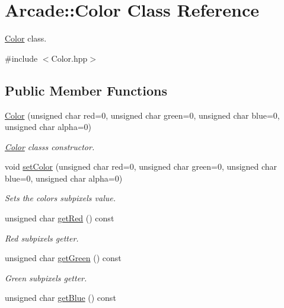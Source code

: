 \hypertarget{class_arcade_1_1_color}{}\section{Arcade\+:\+:Color Class Reference}
\label{class_arcade_1_1_color}


\hyperlink{class_arcade_1_1_color}{Color} class.  




{\ttfamily \#include $<$Color.\+hpp$>$}

\subsection*{Public Member Functions}
\begin{DoxyCompactItemize}
\item 
\hyperlink{class_arcade_1_1_color_a5768ff8d3964d283212a557229c92291}{Color} (unsigned char red=0, unsigned char green=0, unsigned char blue=0, unsigned char alpha=0)
\begin{DoxyCompactList}\small\item\em \hyperlink{class_arcade_1_1_color}{Color} class\textquotesingle{}s constructor. \end{DoxyCompactList}\item 
void \hyperlink{class_arcade_1_1_color_a36b3aa4c6bb04119432f0c7a7721f9dd}{set\+Color} (unsigned char red=0, unsigned char green=0, unsigned char blue=0, unsigned char alpha=0)
\begin{DoxyCompactList}\small\item\em Sets the color\textquotesingle{}s subpixels value. \end{DoxyCompactList}\item 
unsigned char \hyperlink{class_arcade_1_1_color_a536bf6ccc3a5024d5759eb267506742f}{get\+Red} () const
\begin{DoxyCompactList}\small\item\em Red subpixel\textquotesingle{}s getter. \end{DoxyCompactList}\item 
unsigned char \hyperlink{class_arcade_1_1_color_a1cb9e94a1205611e69dd0ac1ae9772d4}{get\+Green} () const
\begin{DoxyCompactList}\small\item\em Green subpixel\textquotesingle{}s getter. \end{DoxyCompactList}\item 
unsigned char \hyperlink{class_arcade_1_1_color_adbdb9649465fbc18721ae679e2ef6eb3}{get\+Blue} () const

\end{DoxyCompactItemize}
